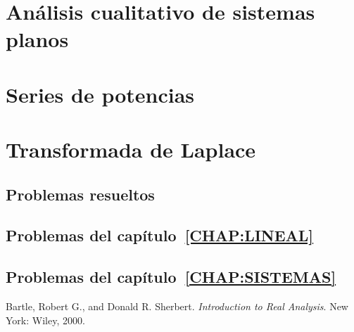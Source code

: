 \documentclass[draft, a4paper, 10pt, openany]{book}
\begin{document}
\chapter{Análisis cualitativo de sistemas planos}
\label{CHAP:CUALITATIVO}


\chapter{Series de potencias}
\label{CHAP:SERIES}


\chapter{Transformada de Laplace}
\label{CHAP:LAPLACE}


\begin{appendices}

\chapter{Problemas resueltos}

\section{Problemas del capítulo~\ref{CHAP:LINEAL}}


\section{Problemas del capítulo~\ref{CHAP:SISTEMAS}}


\end{appendices}

\backmatter

\listoffigures

\listoftables

\begin{thebibliography}{1}
		Bartle, Robert G., and Donald R. Sherbert.
		\textit{Introduction to Real Analysis}. 
		New York: Wiley, 2000. 
\end{thebibliography}
\end{document}
